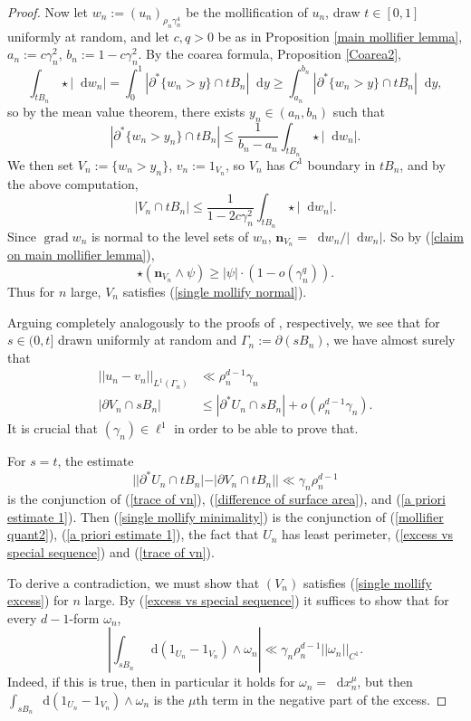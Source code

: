 \documentclass[reqno,10pt]{amsart}
\newcommand*\dif{\mathop{}\!\mathrm{d}}
\DeclareMathOperator{\grad}{grad}
\newcommand{\normal}{\mathbf n}
\theoremstyle{definition}
\numberwithin{equation}{section}
\begin{document}
\begin{proof}
Now let $w_n := (u_n)_{\rho_n \gamma_n^4}$ be the mollification of $u_n$, draw $t \in [0, 1]$ uniformly at random, and let $c, q > 0$ be as in Proposition \ref{main mollifier lemma}, $a_n := c\gamma_n^2$, $b_n := 1 - c\gamma_n^2$.
By the coarea formula, Proposition \ref{Coarea2},
$$\int_{tB_n} \star |\dif w_n| = \int_0^1 |\partial^* \{w_n > y\} \cap tB_n| \dif y \geq \int_{a_n}^{b_n} |\partial^* \{w_n > y\} \cap tB_n| \dif y,$$
so by the mean value theorem, there exists $y_n \in (a_n, b_n)$ such that
$$|\partial^* \{w_n > y_n\} \cap tB_n| \leq \frac{1}{b_n - a_n} \int_{tB_n} \star |\dif w_n|.$$
We then set $V_n := \{w_n > y_n\}$, $v_n := 1_{V_n}$, so $V_n$ has $C^1$ boundary in $tB_n$, and by the above computation,
\begin{equation}\label{MVT mollifier}
|V_n \cap tB_n| \leq \frac{1}{1 - 2c\gamma_n^2} \int_{tB_n} \star |\dif w_n|.
\end{equation}
Since $\grad w_n$ is normal to the level sets of $w_n$, $\normal_{V_n} = \dif w_n/|\dif w_n|$.
So by (\ref{claim on main mollifier lemma}),
$$\star(\normal_{V_n} \wedge \psi) \geq |\psi| \cdot (1 - o(\gamma_n^q)).$$
Thus for $n$ large, $V_n$ satisfies (\ref{single mollify normal}).

Arguing completely analogously to the proofs of \cite[(7.23), (7.22)]{Giusti77}, respectively, we see that
for $s \in (0, t]$ drawn uniformly at random and $\Gamma_n := \partial(sB_n)$, we have almost surely that
\begin{align}
||u_n - v_n||_{L^1(\Gamma_n)} &\ll \rho_n^{d - 1} \gamma_n \label{trace of vn} \\
|\partial V_n \cap sB_n| &\leq |\partial^* U_n \cap sB_n| + o(\rho_n^{d - 1} \gamma_n). \label{difference of surface area}
\end{align}
It is crucial that $(\gamma_n) \in \ell^1$ in order to be able to prove that.

For $s = t$, the estimate
\begin{equation}
||\partial^* U_n \cap tB_n| - |\partial V_n \cap tB_n|| \ll \gamma_n \rho_n^{d - 1} \label{mollifier quant2}
\end{equation}
is the conjunction of (\ref{trace of vn}), (\ref{difference of surface area}), and (\ref{a priori estimate 1}).
Then (\ref{single mollify minimality}) is the conjunction of (\ref{mollifier quant2}), (\ref{a priori estimate 1}), the fact that $U_n$ has least perimeter, (\ref{excess vs special sequence}) and (\ref{trace of vn}).

To derive a contradiction, we must show that $(V_n)$ satisfies (\ref{single mollify excess}) for $n$ large.
By (\ref{excess vs special sequence}) it suffices to show that for every $d-1$-form $\omega_n$,
\begin{equation}\label{mollifier quant3}
\left|\int_{sB_n} \dif(1_{U_n} - 1_{V_n}) \wedge \omega_n\right| \ll \gamma_n \rho_n^{d - 1} ||\omega_n||_{C^1}.
\end{equation}
Indeed, if this is true, then in particular it holds for $\omega_n = \dif x^\mu_n$, but then $\int_{sB_n} \dif(1_{U_n} - 1_{V_n}) \wedge \omega_n$ is the $\mu$th term in the negative part of the excess.


\end{proof}
\end{document}
